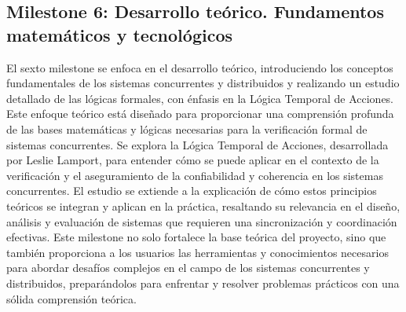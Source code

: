 \subsection{Milestone 6: Desarrollo teórico. Fundamentos matemáticos y tecnológicos}\label{subsection:PMV6}
El sexto milestone se enfoca en el desarrollo teórico, introduciendo los conceptos fundamentales de los sistemas concurrentes y distribuidos y realizando un estudio detallado de las lógicas formales, con énfasis en la Lógica Temporal de Acciones. Este enfoque teórico está diseñado para proporcionar una comprensión profunda de las bases matemáticas y lógicas necesarias para la verificación formal de sistemas concurrentes. Se explora la Lógica Temporal de Acciones, desarrollada por Leslie Lamport, para entender cómo se puede aplicar en el contexto de la verificación y el aseguramiento de la confiabilidad y coherencia en los sistemas concurrentes. El estudio se extiende a la explicación de cómo estos principios teóricos se integran y aplican en la práctica, resaltando su relevancia en el diseño, análisis y evaluación de sistemas que requieren una sincronización y coordinación efectivas. Este milestone no solo fortalece la base teórica del proyecto, sino que también proporciona a los usuarios las herramientas y conocimientos necesarios para abordar desafíos complejos en el campo de los sistemas concurrentes y distribuidos, preparándolos para enfrentar y resolver problemas prácticos con una sólida comprensión teórica.

